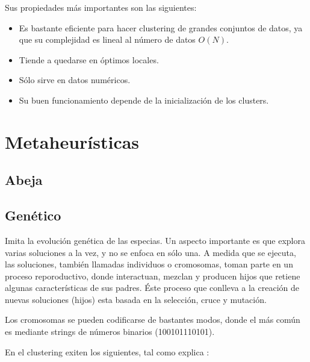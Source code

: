 Sus propiedades m\'as importantes son las siguientes:

\begin{itemize}

\item Es bastante eficiente para hacer clustering de grandes conjuntos de datos,
ya que su complejidad es lineal al n\'umero de datos $O(N)$.

\item Tiende a quedarse en \'optimos locales.

\item S\'olo sirve en datos num\'ericos.

\item Su buen funcionamiento depende de la inicializaci\'on de los clusters.

\end{itemize}

\section{Metaheur\'isticas} \label{sect:meta}

\subsection{Abeja} \label{sect:metabee}

\subsection{Gen\'etico} \label{sect:metaga}

Imita la evoluci\'on gen\'etica de las especias. Un aspecto importante es que
explora varias soluciones a la vez, y no se enfoca en s\'olo una. A medida que
se ejecuta, las soluciones, tambi\'en llamadas individuos o cromosomas, 
toman parte en un proceso reporoductivo, donde interactuan, mezclan y producen
hijos que retiene algunas caracter\'isticas de sus padres. \'Este proceso
que conlleva a la creaci\'on de nuevas soluciones (hijos) esta basada en
la selecci\'on, cruce y mutaci\'on\cite{DoGeGr2007}.

Los cromosomas se pueden codificarse de bastantes modos, donde el m\'as 
com\'un es mediante strings de n\'umeros binarios (100101110101).

En el clustering exiten los siguientes, tal como explica \cite{HrCaFr2009}:

